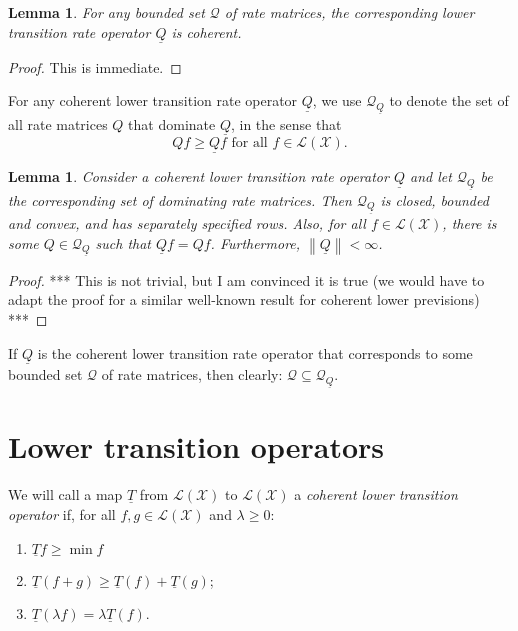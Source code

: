 \documentclass[a4paper,reqno]{amsart}
\newtheorem{lemma}[theorem]{Lemma}
\newcommand{\states}{\mathcal{X}}
\newcommand{\lt}{\underline{T}}
\newcommand{\gambles}{\mathcal{L}}
\newcommand{\gamblesX}{\gambles(\states)}
\newcommand{\rateset}{\mathcal{Q}}
\newcommand{\lrate}{\underline{Q}}
\newcommand{\norm}[1]{\left\lVert #1 \right\rVert}
\begin{document}
\begin{lemma}\label{lemma:lrateiscoherent}
For any bounded set $\rateset$ of rate matrices, the corresponding lower transition rate operator $\lrate$ is coherent.
\end{lemma}
\begin{proof}
This is immediate.
\end{proof}

For any coherent lower transition rate operator $\lrate$, we use $\rateset_{\lrate}$ to denote the set of all rate matrices $Q$ that dominate $\lrate$, in the sense that
\begin{equation*}
Qf\geq\lrate f\text{ for all $f\in\gamblesX$.}
\end{equation*}

\begin{lemma}
Consider a coherent lower transition rate operator $\lrate$ and let $\rateset_{\lrate}$ be the corresponding set of dominating rate matrices. Then $\rateset_{\lrate}$ is closed, bounded and convex, and has separately specified rows. Also, for all $f\in\gamblesX$, there is some $Q\in\rateset_{\lrate}$ such that $\lrate f=Qf$. Furthermore, $\norm{\lrate}<\infty$.
\end{lemma}
\begin{proof}
*** This is not trivial, but I am convinced it is true (we would have to adapt the proof for a similar well-known result for coherent lower previsions) ***
\end{proof}

\noindent
If $\lrate$ is the coherent lower transition rate operator that corresponds to some bounded set $\rateset$ of rate matrices, then clearly: $\rateset\subseteq\rateset_{\lrate}$.

\section{Lower transition operators}

We will call a map $\lt$ from $\gamblesX$ to $\gamblesX$ a \emph{coherent lower transition operator} if, for all $f,g\in\gamblesX$ and $\lambda\geq0$:

\vspace{5pt}
\begin{enumerate}[label=C\arabic*:]
\item
$\lt f\geq\min f$
\item
$\lt(f+g)\geq\lt(f)+\lt(g)$;
\item
$\lt(\lambda f)=\lambda\lt(f)$.
\end{enumerate}
\vspace{5pt}
\end{document}
